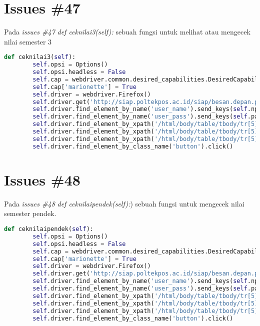 \section{Issues \#47}
Pada \textit{issues \#47} \textit{def ceknilai3(self):} sebuah fungsi untuk melihat atau mengecek nilai semester 3
\begin{lstlisting}[language=Python]
 def ceknilai3(self):
        self.opsi = Options()
        self.opsi.headless = False
        self.cap = webdriver.common.desired_capabilities.DesiredCapabilities().FIREFOX
        self.cap['marionette'] = True
        self.driver = webdriver.Firefox()
        self.driver.get('http://siap.poltekpos.ac.id/siap/besan.depan.php')
        self.driver.find_element_by_name('user_name').send_keys(self.npm)
        self.driver.find_element_by_name('user_pass').send_keys(self.paswd)
        self.driver.find_element_by_xpath('/html/body/table/tbody/tr[5]/td/table[1]/tbody/tr/td[2]/table[2]/tbody/tr[1]/td[2]/div/form/input[4]').click()
        self.driver.find_element_by_xpath('/html/body/table/tbody/tr[5]/td/table[1]/tbody/tr/td[1]/table[2]/tbody/tr[1]/td[2]/a[5]').click()
        self.driver.find_element_by_xpath('/html/body/table/tbody/tr[5]/td/table[3]/tbody/tr[1]/td[2]/p[1]/table/tbody/tr/td[3]/select/option[2]').click()
        self.driver.find_element_by_class_name('button').click()
\end{lstlisting}

\section{Issues \#48}
Pada \textit{issues \#48} \textit{def ceknilaipendek(self):}) sebuah fungsi untuk mengecek nilai semester pendek.
\begin{lstlisting}[language=Python]
 def ceknilaipendek(self):
        self.opsi = Options()
        self.opsi.headless = False
        self.cap = webdriver.common.desired_capabilities.DesiredCapabilities().FIREFOX
        self.cap['marionette'] = True
        self.driver = webdriver.Firefox()
        self.driver.get('http://siap.poltekpos.ac.id/siap/besan.depan.php')
        self.driver.find_element_by_name('user_name').send_keys(self.npm)
        self.driver.find_element_by_name('user_pass').send_keys(self.paswd)
        self.driver.find_element_by_xpath('/html/body/table/tbody/tr[5]/td/table[1]/tbody/tr/td[2]/table[2]/tbody/tr[1]/td[2]/div/form/input[4]').click()
        self.driver.find_element_by_xpath('/html/body/table/tbody/tr[5]/td/table[1]/tbody/tr/td[1]/table[2]/tbody/tr[1]/td[2]/a[5]').click()
        self.driver.find_element_by_xpath('/html/body/table/tbody/tr[5]/td/table[3]/tbody/tr[1]/td[2]/p[1]/table/tbody/tr/td[3]/select/option[3]').click()
        self.driver.find_element_by_class_name('button').click()
\end{lstlisting}

